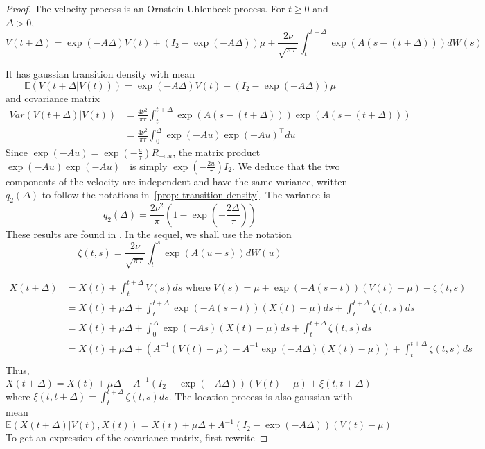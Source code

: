 \documentclass[11pt]{article}
\newcommand {\E}{\mathbb{E}}
\newcommand {\1}{\mathbb{1}}
\theoremstyle{definition}
\theoremstyle{remark}
\theoremstyle{remark}
\begin{document}
\begin{proof}
The velocity process is an Ornstein-Uhlenbeck process. For $t \geq 0$ and $\Delta >0$,
\begin{equation}
	V(t+\Delta)=\exp(-A\Delta) V(t)+ (I_2-\exp(-A\Delta))\mu +\frac{2\nu}{\sqrt{\pi \tau}}\int_{t}^{t+\Delta} \exp(A(s-(t+\Delta))) dW(s)
	\label{eq: RACVM solution}
\end{equation}

It has gaussian transition density with mean 
\begin{equation}
	\E(V(t+\Delta \vert V(t)))=\exp(-A\Delta) V(t)+ (I_2-\exp(-A\Delta))\mu 
\end{equation}
and covariance matrix 
\begin{align*}Var(V(t+\Delta) \vert V(t))&=\frac{4\nu^2}{\pi \tau} \int_{t}^{t+\Delta} \exp(A(s-(t+\Delta))) \exp(A(s-(t+\Delta)))^{\top}\\
	&=\frac{4\nu^2}{\pi \tau} \int_{0}^{\Delta} \exp(-Au) \exp(-Au)^{\top} du 
\end{align*}
Since $\exp(-Au)=\exp(-\frac{u}{\tau}) R_{-\omega u}$, the matrix product  $\exp(-Au) \exp(-Au)^{\top}$ is simply $\exp(-\frac{2u}{\tau}) I_2$. We deduce that the two components of the velocity are independent and have the same variance, written $q_2(\Delta)$ to follow the notations in~\ref{prop: transition density}. The variance is 
\begin{equation}
	q_2(\Delta)=\frac{2\nu^2}{\pi}\left(1-\exp\left(-\frac{2\Delta}{\tau}\right)\right)
\end{equation}
These results are found in \cite{gurarie_correlated_2017}.
In the sequel, we shall use the notation 
\[\zeta(t,s) =\frac{2\nu}{\sqrt{\pi \tau}}\int_{t}^{s} \exp(A(u-s)) dW(u)\] 


\begin{align*}
	X(t+\Delta)&=X(t)+\int_t^{t+\Delta} V(s) ds \mbox{ where } V(s)=\mu+\exp(-A(s-t))(V(t)-\mu)+\zeta(t,s) \\
	&= X(t)+\mu \Delta+\int_t^{t+\Delta} \exp(-A(s-t))(X(t)-\mu) ds +\int_t^{t+\Delta} \zeta(t,s) ds \\
	&= X(t)+\mu \Delta +\int_0^{\Delta} \exp(-As)(X(t)-\mu) ds +\int_t^{t+\Delta} \zeta(t,s) ds \\
	&=X(t)+\mu \Delta + (A^{-1}(V(t)-\mu)-A^{-1}\exp(-A\Delta)(X(t)-\mu))+\int_t^{t+\Delta} \zeta(t,s) ds \\
\end{align*}
Thus, 
\begin{equation}
	X(t+\Delta)=X(t)+\mu \Delta+A^{-1} \left( I_2-\exp(-A\Delta)\right)(V(t)-\mu) +\xi(t,t+\Delta) 
\end{equation}
where $ \xi(t,t+\Delta)=\int_t^{t+\Delta} \zeta(t,s)ds$.
The location process is also gaussian with mean 
\begin{equation}
	\E(X(t+\Delta) \vert V(t),X(t)) =X(t)+\mu \Delta+A^{-1} \left( I_2-\exp(-A\Delta)\right)(V(t)-\mu)
\end{equation}
To get an expression of the covariance matrix, first rewrite


\end{proof}
\end{document}
